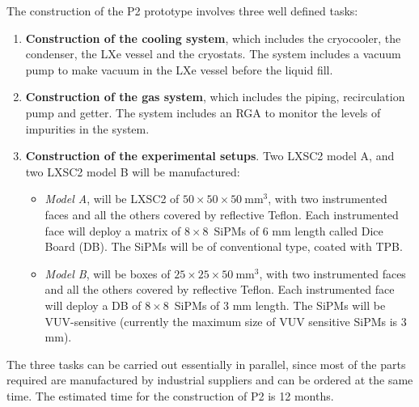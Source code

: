The construction of the P2 prototype involves three well defined tasks: 
\begin{enumerate}
\item {\bf Construction of the cooling system}, which includes the cryocooler, the condenser, the LXe vessel and the cryostats.  The system includes a vacuum pump to make vacuum in the LXe vessel before the liquid fill.
\item {\bf Construction of the gas system}, which includes the piping, recirculation pump and getter. The system includes an RGA to monitor the levels of impurities in the system. 
\item {\bf Construction of the experimental setups}. Two LXSC2 model A, and two LXSC2 model B will be 
manufactured:
\begin{itemize}
\item {\em Model A}, will be LXSC2 of $50 \times 50 \times 50 \mathrm{~mm^3}$, with two instrumented faces and all the others covered by reflective Teflon. Each instrumented face will deploy a matrix of $8 \times 8$~SiPMs of 6 mm length called Dice Board (DB). The SiPMs will be of conventional type, coated with TPB.
\item {\em Model B}, will be boxes of $25 \times 25 \times 50 \mathrm{~mm^3}$, with two instrumented faces and all the others covered by reflective Teflon. Each instrumented face will deploy a DB of $8 \times 8$~SiPMs of 3 mm length. The SiPMs will be VUV-sensitive (currently the maximum size of VUV sensitive SiPMs is 3 mm). 
\end{itemize}
\end{enumerate}

The three tasks can be carried out essentially in parallel, since most of the parts required are manufactured by industrial suppliers and can be ordered at the same time. The estimated time for the construction of P2 is 12 months. 


 
